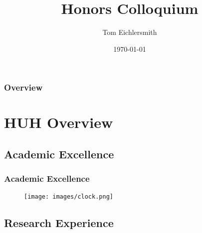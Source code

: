 \documentclass{beamer}
\title[HUH Colloquium]{Honors Colloquium} %
\author{Tom Eichlersmith}
\institute[Hamline U]
{
Hamline University \\
\medskip
\texttt{teichlersmith01@hamline.edu}
}
\date{\today}
\begin{document}
\begin{frame}
\titlepage %
\end{frame}

\begin{frame}
\frametitle{Overview} %
\tableofcontents %
\end{frame}


\section{HUH Overview} 

\subsection{Academic Excellence} %

\begin{frame}
	
\frametitle{Academic Excellence}

\begin{figure}[h]
	\texttt{[image: images/clock.png]}
\end{figure}

\end{frame}


\subsection{Research Experience}
\end{document}
